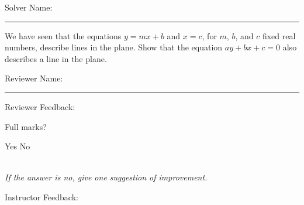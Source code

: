 \documentclass[12pt]{exam}
\begin{document}
\pagestyle{headandfoot}
\firstpageheadrule

Solver Name:\enspace\rule{5cm}{0.8pt}

\begin{questions}
\question
We have seen that the equations $y=mx+b$ and $x=c$, for $m$, $b$, and $c$ fixed real numbers, describe lines in the plane. Show that the equation $ay+bx+c=0$ also describes a line in the plane.

\end{questions}

Reviewer Name:\enspace\rule{5cm}{0.8pt}

\begin{questions}
\question
Reviewer Feedback:

Full marks? \begin{oneparcheckboxes}
\choice Yes
\choice No
\end{oneparcheckboxes}\\
\textit{If the answer is no, give one suggestion of improvement.}

\question

Instructor Feedback:



\end{questions}
\end{document}
